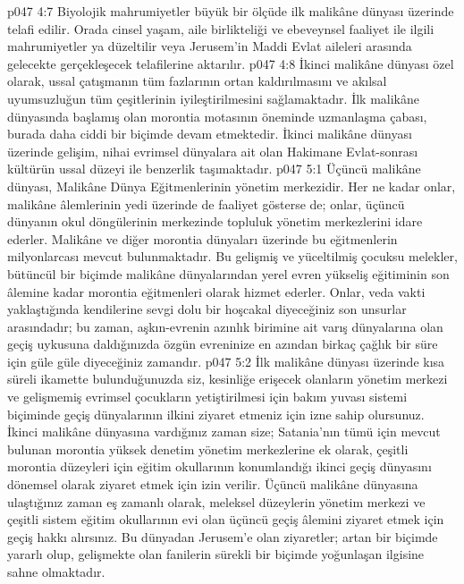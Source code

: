 \vs p047 4:7 Biyolojik mahrumiyetler büyük bir ölçüde ilk malikâne dünyası üzerinde telafi edilir. Orada cinsel yaşam, aile birlikteliği ve ebeveynsel faaliyet ile ilgili mahrumiyetler ya düzeltilir veya Jerusem’in Maddi Evlat aileleri arasında gelecekte gerçekleşecek telafilerine aktarılır.
\vs p047 4:8 İkinci malikâne dünyası özel olarak, ussal çatışmanın tüm fazlarının ortan kaldırılmasını ve akılsal uyumsuzluğun tüm çeşitlerinin iyileştirilmesini sağlamaktadır. İlk malikâne dünyasında başlamış olan morontia motasının öneminde uzmanlaşma çabası, burada daha ciddi bir biçimde devam etmektedir. İkinci malikâne dünyası üzerinde gelişim, nihai evrimsel dünyalara ait olan Hakimane Evlat\hyp{}sonrası kültürün ussal düzeyi ile benzerlik taşımaktadır.
\vs p047 5:1 Üçüncü malikâne dünyası, Malikâne Dünya Eğitmenlerinin yönetim merkezidir. Her ne kadar onlar, malikâne âlemlerinin yedi üzerinde de faaliyet gösterse de; onlar, üçüncü dünyanın okul döngülerinin merkezinde topluluk yönetim merkezlerini idare ederler. Malikâne ve diğer morontia dünyaları üzerinde bu eğitmenlerin milyonlarcası mevcut bulunmaktadır. Bu gelişmiş ve yüceltilmiş çocuksu melekler, bütüncül bir biçimde malikâne dünyalarından yerel evren yükseliş eğitiminin son âlemine kadar morontia eğitmenleri olarak hizmet ederler. Onlar, veda vakti yaklaştığında kendilerine sevgi dolu bir hoşcakal diyeceğiniz son unsurlar arasındadır; bu zaman, aşkın\hyp{}evrenin azınlık birimine ait varış dünyalarına olan geçiş uykusuna daldığınızda özgün evreninize en azından birkaç çağlık bir süre için güle güle diyeceğiniz zamandır.
\vs p047 5:2 İlk malikâne dünyası üzerinde kısa süreli ikamette bulunduğunuzda siz, kesinliğe erişecek olanların yönetim merkezi ve gelişmemiş evrimsel çocukların yetiştirilmesi için bakım yuvası sistemi biçiminde geçiş dünyalarının ilkini ziyaret etmeniz için izne sahip olursunuz. İkinci malikâne dünyasına vardığınız zaman size; Satania’nın tümü için mevcut bulunan morontia yüksek denetim yönetim merkezlerine ek olarak, çeşitli morontia düzeyleri için eğitim okullarının konumlandığı ikinci geçiş dünyasını dönemsel olarak ziyaret etmek için izin verilir. Üçüncü malikâne dünyasına ulaştığınız zaman eş zamanlı olarak, meleksel düzeylerin yönetim merkezi ve çeşitli sistem eğitim okullarının evi olan üçüncü geçiş âlemini ziyaret etmek için geçiş hakkı alırsınız. Bu dünyadan Jerusem’e olan ziyaretler; artan bir biçimde yararlı olup, gelişmekte olan fanilerin sürekli bir biçimde yoğunlaşan ilgisine sahne olmaktadır.
